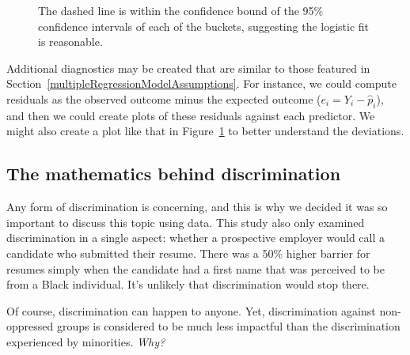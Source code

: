 \begin{figure}
  \centering
  \caption{The dashed line is within the confidence bound
       of the 95\% confidence intervals of each of the buckets,
       suggesting the logistic fit is reasonable.}
  \label{logisticModelBucketDiag}
\end{figure}

Additional diagnostics may be created that are similar to those
featured in Section~\ref{multipleRegressionModelAssumptions}.
For instance, we could compute residuals as
the observed outcome minus the expected outcome
($e_i = Y_i - \hat{p}_i$),
and then we could create plots of these residuals
against each predictor.
We might also create a plot like that in
Figure~\ref{logisticModelBucketDiag}
to better understand the deviations.



\newpage

\subsection{The mathematics behind discrimination}


Any form of discrimination is concerning,
and this is why we decided it was so important to discuss
this topic using data.
This study also only examined discrimination in a
single aspect: whether a prospective employer would
call a candidate who submitted their resume.
There was a 50\% higher barrier for resumes simply when
the candidate had a first name that was perceived to be
from a Black individual.
It's unlikely that discrimination would stop there.

Of course, discrimination can happen to anyone.
Yet, discrimination against non-oppressed groups is
considered to be much less impactful than
the discrimination experienced by minorities.
\emph{Why?}

